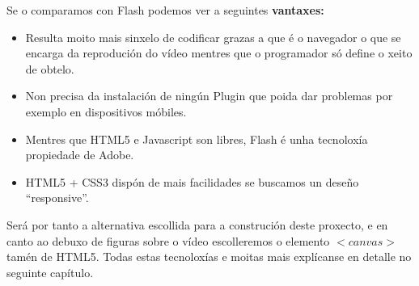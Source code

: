 		Se o comparamos con Flash podemos ver a seguintes \textbf{vantaxes:}
		\begin{itemize}
            \item Resulta moito mais sinxelo de codificar grazas a que é o navegador o que se 
            encarga da reprodución do vídeo mentres que o programador só define o xeito de obtelo.
            \item Non precisa da instalación de ningún Plugin que poida dar problemas por exemplo 
            en dispositivos móbiles.
            \item Mentres que HTML5 e Javascript son libres, Flash é unha tecnoloxía propiedade de 
            Adobe.
            \item HTML5 + CSS3 dispón de mais facilidades se buscamos un deseño ``responsive''.
        \end{itemize}

		Será por tanto a alternativa escollida para a construción deste proxecto, e en canto ao 
		debuxo de figuras sobre o vídeo escolleremos o elemento $<canvas>$ tamén de HTML5. Todas
		estas tecnoloxías e moitas mais explícanse en detalle no seguinte capítulo.
		